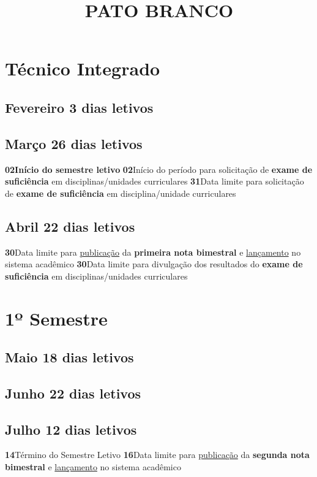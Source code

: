 \documentclass[thesis]{hmcposter}
\author{ }
\title{PATO BRANCO}
\begin{document}
\begin{poster}
\normalsize\section{\color{hmcorange}Técnico Integrado}\subsection{Fevereiro \hfill 3 dias letivos}\subsection{Março \hfill 26 dias letivos}\textbf{02}\qquad \textbf{Início do semestre letivo} \newline \null\textbf{02}\qquad Início do período para solicitação de \textbf{exame de suficiência} em disciplinas/unidades curriculares \newline \null\textbf{31}\qquad Data limite para solicitação de \textbf{exame de suficiência} em disciplina/unidade curriculares \newline \null\subsection{Abril \hfill 22 dias letivos}\textbf{30}\qquad Data limite para \underline{publicação} da \textbf{primeira nota bimestral} e \underline{lançamento} no sistema acadêmico \newline \null\textbf{30}\qquad Data limite para divulgação dos resultados do \textbf{exame de suficiência} em disciplinas/unidades curriculares \newline \null\vfill\null
\columnbreak
\section{\hfill \color{hmcorange}1º Semestre}
\subsection{Maio \hfill 18 dias letivos}\subsection{Junho \hfill 22 dias letivos}\subsection{Julho \hfill 12 dias letivos}\textbf{14}\qquad Término do Semestre Letivo \newline \null\textbf{16}\qquad Data limite para \underline{publicação} da \textbf{segunda nota bimestral} e \underline{lançamento} no sistema acadêmico \newline \null\newpage

\end{poster}
\end{document}
